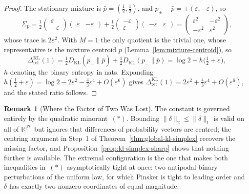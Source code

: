 \documentclass[12pt]{article}
\theoremstyle{definition}
\newtheorem{remark}[theorem]{Remark}
\newcommand{\RetKL}{\Delta_{\mathrm{ret}}^{\mathrm{KL}}}
\begin{document}
\begin{proof}
The stationary mixture is $\bar p=(\tfrac12,\tfrac12)$, and
$p_\pm-\bar p=\pm(\varepsilon,-\varepsilon)$, so
\[
\Sigma_p
=
\tfrac12\begin{pmatrix}\varepsilon\\-\varepsilon\end{pmatrix}
\begin{pmatrix}\varepsilon&-\varepsilon\end{pmatrix}
+
\tfrac12\begin{pmatrix}-\varepsilon\\\varepsilon\end{pmatrix}
\begin{pmatrix}-\varepsilon&\varepsilon\end{pmatrix}
=
\begin{pmatrix}\varepsilon^2&-\varepsilon^2\\-\varepsilon^2&\varepsilon^2\end{pmatrix},
\]
whose trace is $2\varepsilon^2$.  With $M=1$ the only quotient is the trivial
one, whose representative is the mixture centroid $\bar p$
(Lemma~\ref{lem:mixture-centroid}), so
\[
\RetKL(1)
=
\tfrac12D_{\mathrm{KL}}(p_+\|\bar p)+\tfrac12D_{\mathrm{KL}}(p_-\|\bar p)
=
\log2-h\bigl(\tfrac12+\varepsilon\bigr),
\]
$h$ denoting the binary entropy in nats.  Expanding
$h(\tfrac12+\varepsilon)=\log2-2\varepsilon^2-\tfrac43\varepsilon^4+O(\varepsilon^6)$
gives $\RetKL(1)=2\varepsilon^2+\tfrac43\varepsilon^4+O(\varepsilon^6)$, and the
stated ratio follows.
\end{proof}

\begin{remark}[Where the Factor of Two Was Lost]
\label{rem:kl-simplex-constant}
The constant is governed entirely by the quadratic minorant~$(*)$.  Bounding
$\|\delta\|_2\le\|\delta\|_1$ is valid on all of $\mathbb R^{|\mathcal O|}$ but
ignores that differences of probability vectors are centred; the centring
argument in Step~1 of Theorem~\ref{thm:global-kl-simplex} recovers the missing
factor, and Proposition~\ref{prop:kl-simplex-sharp} shows that nothing further
is available.  The extremal configuration is the one that makes both
inequalities in~$(*)$ asymptotically tight at once: two antipodal binary
perturbations of the uniform law, for which Pinsker is tight to leading order
and $\delta$ has exactly two nonzero coordinates of equal magnitude.
\end{remark}
\end{document}
